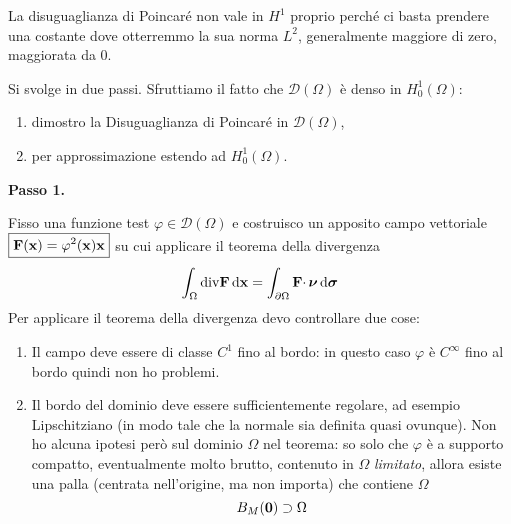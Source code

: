 \begin{oss}
    La disuguaglianza di Poincaré non vale in $H^{1} $ proprio perché ci basta prendere una costante dove otterremmo la sua norma $L^2$, generalmente maggiore di zero, maggiorata da $0$.
\end{oss}
\begin{dimostrazione}
    Si svolge in due passi. Sfruttiamo il fatto che $\mathcal{D}(\Omega)$ è denso in $H_{0}^{1}(\Omega)$:
    \begin{enumerate}
        \item dimostro la Disuguaglianza di Poincaré in $\mathcal{D}(\Omega)$,
        \item per approssimazione estendo ad $H_{0}^{1}(\Omega)$.
    \end{enumerate}

    \textbf{Passo 1.}

    Fisso una funzione test $\varphi \in \mathcal{D}(\Omega)$ e costruisco un apposito campo vettoriale $\boxed{\mathbf{F}(\mathbf{x}) =\varphi ^{2}(\mathbf{x})\mathbf{x}}$ su cui applicare il teorema della divergenza
    \begin{equation*}
        \int _{\Omega }\mathrm{div}\mathbf{F} \,\mathrm d \mathbf{x} =\int _{\partial \Omega }\mathbf{F} \cdotp \bm{\nu } \,\mathrm d \bm{\sigma}
    \end{equation*}
    Per applicare il teorema della divergenza devo controllare due cose:
    \begin{enumerate}
        \item Il campo deve essere di classe $C^{1}$ fino al bordo: in questo caso $\varphi $ è $C^{\infty }$ fino al bordo quindi non ho problemi.
        \item Il bordo del dominio deve essere sufficientemente regolare, ad esempio Lipschitziano (in modo tale che la normale sia definita quasi ovunque). Non ho alcuna ipotesi però sul dominio $\Omega $ nel teorema: so solo che $\varphi $ è a supporto compatto, eventualmente molto brutto, contenuto in $\Omega $ \textit{limitato}, allora esiste una palla (centrata nell'origine, ma non importa) che contiene $\Omega $
              \begin{equation*}
                  B_{M}(\mathbf{0}) \supset \Omega
              \end{equation*}

              \begin{figure}[H]
                  \centering


\end{figure}
\end{enumerate}
\end{dimostrazione}
